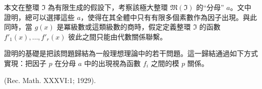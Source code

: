 \documentclass[11pt]{article}
\begin{document}
本文在整環 $\mathfrak{I}$ 為有限生成的假設下，考察該極大整環 $\mathfrak{M}(\mathfrak{I})$ 的“分母” $a$。文中證明，總可以選擇這些 $a$，使得在其全體中只有有限多個素數作為因子出現。與此同時，當 $g(x)$ 是冪級數或這類級數的商時，假定定義整環 $\mathfrak{I}$ 的函數 $f'_1(x),\ldots,f'_r(x)$ 彼此之間只能由代數關係聯繫。

證明的基礎是把該問題歸結為一般理想理論中的若干問題。這一歸結通過如下方式實現：把因子 $p$ 在分母 $a$ 中的出現視為函數 $f_i$ 之間的模 $p$ 關係。

\begin{center}
(Rec. Math. XXXVI:1; 1929).
\end{center}
\endgroup

\setcounter{footnote}{0}
\clearpage
\end{document}
